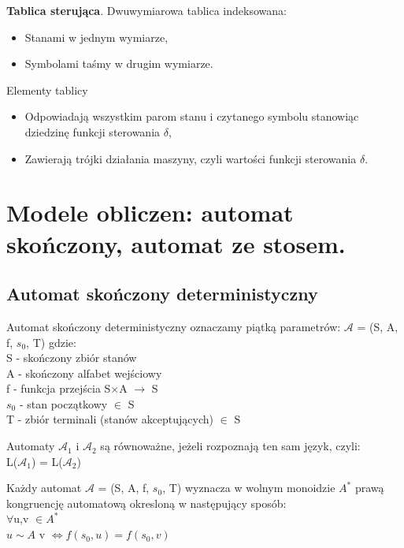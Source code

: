 \documentclass[12pt]{article}
\begin{document}
    \begin{definition}
        \textbf{Tablica sterująca}. Dwuwymiarowa tablica indeksowana:
        \begin{itemize}
            \item Stanami w jednym wymiarze,
            \item Symbolami taśmy w drugim wymiarze.
        \end{itemize}
        Elementy tablicy
        \begin{itemize}
            \item Odpowiadają wszystkim parom stanu i czytanego symbolu stanowiąc dziedzinę
            funkcji sterowania $\delta$,
            \item Zawierają trójki działania maszyny, czyli wartości funkcji sterowania $\delta$.
        \end{itemize}
    \end{definition}

    \newpage

    \section{Modele obliczen: automat skończony, automat ze stosem.}
    \subsection{Automat skończony deterministyczny}
    \begin{definition}
        Automat skończony deterministyczny oznaczamy piątką parametrów: $\mathcal{A}$ = (S, A, f, $s_{0}$, T) gdzie: \\
        S - skończony zbiór stanów \\
        A - skończony alfabet wejściowy \\
        f - funkcja przejścia S$\times$A $\rightarrow$ S \\
        $s_{0}$ - stan początkowy $\in$ S\\
        T - zbiór terminali (stanów akceptujących) $\in$ S
    \end{definition}

    \begin{definition}
        Automaty $\mathcal{A}_{1}$ i  $\mathcal{A}_{2}$ są równoważne, jeżeli rozpoznają ten sam język, czyli: \\
        L($\mathcal{A}_{1}$) = L($\mathcal{A}_{2}$)
    \end{definition}

    \begin{definition}
        Każdy automat $\mathcal{A}$ = (S, A, f, $s_{0}$, T) wyznacza w wolnym monoidzie $A^{*}$ prawą kongruencję automatową okresloną w następujący sposób: \\
        $\forall$u,v $\in A^{*}$ \\
        $u \sim A$ v $\Leftrightarrow f(s_{0}, u) = f(s_{0}, v)$
    \end{definition}
\end{document}
